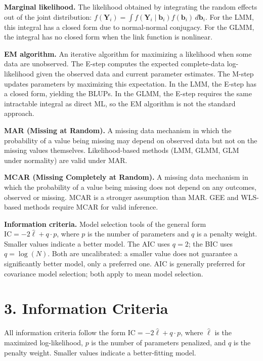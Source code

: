 \documentclass[11pt]{article}
\newcommand{\bY}{\mathbf{Y}}
\begin{document}
\textbf{Marginal likelihood.} The likelihood obtained by integrating the random effects out of the joint distribution: $f(\bY_i) = \int f(\bY_i \mid \mathbf{b}_i) f(\mathbf{b}_i) \, d\mathbf{b}_i$. For the LMM, this integral has a closed form due to normal-normal conjugacy. For the GLMM, the integral has no closed form when the link function is nonlinear.

\textbf{EM algorithm.} An iterative algorithm for maximizing a likelihood when some data are unobserved. The E-step computes the expected complete-data log-likelihood given the observed data and current parameter estimates. The M-step updates parameters by maximizing this expectation. In the LMM, the E-step has a closed form, yielding the BLUPs. In the GLMM, the E-step requires the same intractable integral as direct ML, so the EM algorithm is not the standard approach.

\textbf{MAR (Missing at Random).} A missing data mechanism in which the probability of a value being missing may depend on observed data but not on the missing values themselves. Likelihood-based methods (LMM, GLMM, GLM under normality) are valid under MAR.

\textbf{MCAR (Missing Completely at Random).} A missing data mechanism in which the probability of a value being missing does not depend on any outcomes, observed or missing. MCAR is a stronger assumption than MAR. GEE and WLS-based methods require MCAR for valid inference.

\textbf{Information criteria.} Model selection tools of the general form $\text{IC} = -2\hat{\ell} + q \cdot p$, where $p$ is the number of parameters and $q$ is a penalty weight. Smaller values indicate a better model. The AIC uses $q = 2$; the BIC uses $q = \log(N)$. Both are uncalibrated: a smaller value does not guarantee a significantly better model, only a preferred one. AIC is generally preferred for covariance model selection; both apply to mean model selection.

\newpage

\section*{3. Information Criteria}

All information criteria follow the form $\text{IC} = -2\hat{\ell} + q \cdot p$, where $\hat{\ell}$ is the maximized log-likelihood, $p$ is the number of parameters penalized, and $q$ is the penalty weight. Smaller values indicate a better-fitting model.
\end{document}
